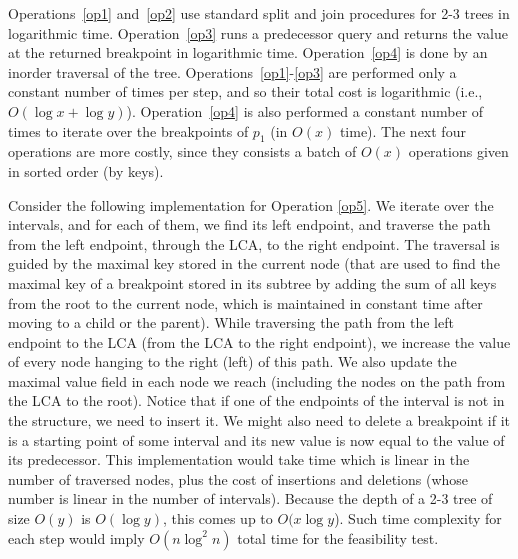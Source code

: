 \documentclass[a4paper,UKenglish]{lipics-v2016}
\theoremstyle{plain}
\begin{document}
Operations~\ref{op1} and~\ref{op2} use standard split and join procedures for 2-3 trees in logarithmic time. 
Operation~\ref{op3} runs a predecessor query and returns the value at the returned breakpoint in logarithmic time.
Operation~\ref{op4} is done by an inorder traversal of the tree. 
Operations~\ref{op1}-\ref{op3} are performed only a constant number of times per step, and so their total cost is logarithmic (i.e., $O(\log x + \log y)$). Operation~\ref{op4} is also performed a constant number of times to iterate over the breakpoints of $p_{1}$ (in $O(x)$ time). The next four operations are more costly, since they consists a batch of $O(x)$ operations given in sorted order (by keys).

\medskip {}
Consider the following implementation for Operation \ref{op5}. We iterate over the intervals, and for each of them, we find its left endpoint, and traverse the path from the left endpoint, through the LCA, to the right endpoint.
The traversal is guided by the maximal key stored in the current node (that are used to find the maximal key of a breakpoint stored in its subtree
by adding the sum of all keys from the root to the current node, which is maintained in constant time after moving to a child or the parent).
While traversing the path from the left endpoint to the LCA (from the LCA to the right endpoint), we increase the value of every node hanging to the right (left) of this path. We also update the maximal value field in each node we reach (including the nodes on the path from the LCA to the root). Notice that if one of the endpoints of the interval is not in the structure, we need to insert it. We might also need to delete a breakpoint if it is a starting point of some interval and its new value is now equal to the value of its predecessor. This implementation would take time which is linear in the number of traversed nodes, plus the cost of insertions and deletions (whose number is linear in the number of intervals). Because the depth of a 2-3 tree of size $O(y)$ is $O(\log y)$, this comes up to $O(x \log y$). Such time complexity for each step would imply $O(n\log^{2}n)$ total time for the feasibility test.
\end{document}
